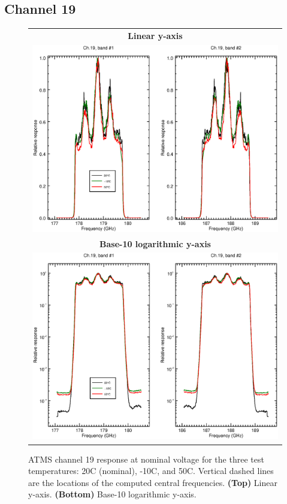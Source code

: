 \subsection{Channel 19}
\begin{figure}[H]
  \label{fig:Tset.ch19_response}
  \centering
  \begin{tabular}{c}
    \hspace{0.75cm}\sffamily\textbf{Linear y-axis} \\
    \includegraphics[scale=0.55]{graphics/srf/Tset/lin/atms_npp-19.eps} \\
    \hspace{0.75cm}\sffamily\textbf{Base-10 logarithmic y-axis} \\
    \includegraphics[scale=0.55]{graphics/srf/Tset/log/atms_npp-19.eps}
  \end{tabular}
  \caption{ATMS channel 19 response at nominal voltage for the three test temperatures: 20\textdegree{}C (nominal), -10\textdegree{}C, and 50\textdegree{}C. Vertical dashed lines are the locations of the computed central frequencies. \textbf{(Top)} Linear y-axis. \textbf{(Bottom)} Base-10 logarithmic y-axis.}
\end{figure}

